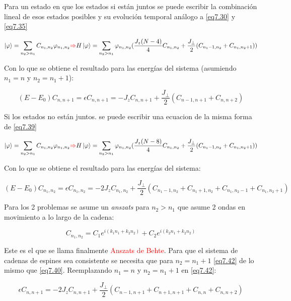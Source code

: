 \documentclass{book}
\begin{document}
Para un estado en que los estados si están juntos se puede escribir la combinación lineal de esos estados posibles y su evolución temporal análogo a \ref{eq7.30} y \ref{eq7.35}

\begin{equation}\label{eq7.39} \ket{\varphi}=\sum_{n_2>n_1}C_{n_1,n_2}\varphi_{n_1,n_2}\textcolor{red}{\Rightarrow}H\ket{\varphi}= \sum_{n_2>n_1} \varphi_{n_1,n_2}(\frac{J_z(N-4)}{4}C_{n_1,n_2}+\frac{J_\perp}{2}(C_{n_1-1,n_2}+C_{n_1,n_2+1}))\end{equation}

Con lo que se obtiene el resultado para las energías del sistema (asumiendo $n_1=n$ y $n_2=n_1+1$):

\begin{equation}\label{eq7.40}(E-E_0)C_{n,n+1}=\epsilon C_{n,n+1}=-J_zC_{n,n+1}+\frac{J_\perp}{2}(C_{n-1,n+1}+C_{n,n+2})\end{equation}

Si los estados no están juntos. se puede escribir una ecuacion de la misma forma de \ref{eq7.39}

\begin{equation}\label{eq7.41} \ket{\varphi}=\sum_{n_2>n_1}C_{n_1,n_2}\varphi_{n_1,n_2}\textcolor{red}{\Rightarrow}H\ket{\varphi}= \sum_{n_2>n_1} \varphi_{n_1,n_2}(\frac{J_z(N-8)}{4}C_{n_1,n_2}+\frac{J_\perp}{2}(C_{n_1-1,n_2}+C_{n_1,n_2+1}))\end{equation}

Con lo que se obtiene el resultado para las energías del sistema:

\begin{equation}\label{eq7.42}(E-E_0)C_{n_1,n_2}=\epsilon C_{n_1,n_2}=-2J_zC_{n_1,n_2}+\frac{J_\perp}{2}(C_{n_1-1,n_2}+C_{n_1+1,n_2}+C_{n_1,n_2-1}+C_{n_1,n_2+1})\end{equation}

Para los 2 problemas se asume un \textit{anszats} para $n_2>n_1$ que asume 2 ondas en movimiento a lo largo de la cadena:

\begin{equation}\label{eq7.43}C_{n_1,n_2}=C_1e^{i(k_1n_1+k_2n_2)}+C_2e^{i(k_2n_1+k_2n_2)}\end{equation}

Este es el que se llama finalmente \textcolor{red}{Anszats de Behte}. Para que el sistema de cadenas de espines sea consistente se necesita que para $n_2=n_1+1$ \ref{eq7.42} de lo mismo que \ref{eq7.40}. Reemplazando $n_1=n$ y $n_2=n_1+1$ en \ref{eq7.42}:

\begin{equation}\label{eq7.44}\epsilon C_{n,n+1}=-2J_zC_{n,n+1}+\frac{J_\perp}{2}(C_{n-1,n+1}+C_{n+1,n+1}+C_{n,n}+C_{n,n+2})\end{equation}
\end{document}
